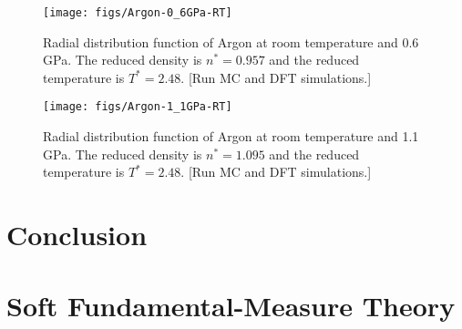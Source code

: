 \documentclass[letterpaper,twocolumn,amsmath,amssymb,prb]{revtex4-1}
\newcommand{\red}[1]{{\color{red} #1}}
\newcommand{\fixme}[1]{\red{[#1]}}
\begin{document}
\begin{figure}
\begin{center}
\texttt{[image: figs/Argon-0\_6GPa-RT]}
\end{center}
\caption{Radial distribution function of Argon at room temperature and
0.6 GPa.  The reduced density is $n^* = 0.957$ and the reduced
temperature is $T^* = 2.48$. \fixme{Run MC and DFT simulations.}}
\label{fig:argon-0.6GPa}
\end{figure}

\begin{figure}
\begin{center}
\texttt{[image: figs/Argon-1\_1GPa-RT]}
\end{center}
\caption{Radial distribution function of Argon at room temperature and
1.1 GPa.  The reduced density is $n^* = 1.095$ and the reduced
temperature is $T^* = 2.48$. \fixme{Run MC and DFT simulations.}}
\label{fig:argon-1.1GPa}
\end{figure}

\section{Conclusion}

\appendix

\section{Soft Fundamental-Measure Theory}
\end{document}

